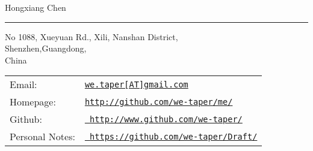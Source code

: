 \documentclass[letterpaper]{article}
\def\name{Hongxiang Chen}
\begin{document}
{\huge \name}
\vspace{+8pt}
\hrule height .7pt
\smallskip

\vspace{0.15in}

\begin{minipage}{0.44\linewidth}
  No 1088, Xueyuan Rd., Xili, Nanshan District,\\
  Shenzhen,Guangdong,\\
  China \\
\end{minipage}
\begin{minipage}{0.55\linewidth}
\begin{tabular}{ll}
Email: 
    & \href{mailto:we.taper[at]gmail.com}{\tt we.taper[AT]gmail.com} \\
Homepage: 
    & \href{http://github.com/we-taper/me/}{\tt http://github.com/we-taper/me/} \\
Github: 
    & \href{http://www.github.com/we-taper/}{\tt
    http://www.github.com/we-taper/} \\
Personal Notes: 
    & \href{https://github.com/we-taper/Draft/}{\tt
    https://github.com/we-taper/Draft/} \\
\end{tabular}
\end{minipage}
\end{document}
